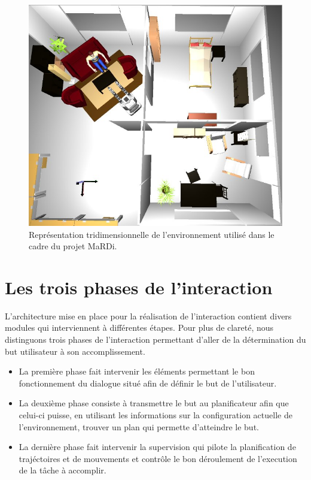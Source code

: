 \documentclass[a4paper,11pt,twoside]{StyleThese}
\begin{document}
\begin{figure}[ht!]
 \centering
  \includegraphics[width=0.89\linewidth]{./img/mardiSetup.jpg} 
  \caption {Représentation tridimensionnelle de l'environnement utilisé dans le cadre du projet MaRDi.}
  \label{fig:env}
\end{figure}


\section{Les trois phases de l'interaction}
\label{sec:troisPhases}



L'architecture mise en place pour la réalisation de l'interaction contient divers modules qui interviennent à différentes étapes.
Pour plus de clareté, nous distinguons trois phases de l'interaction permettant d'aller de la détermination du but utilisateur à son accomplissement. 

\begin{itemize}
\item La première phase fait intervenir les éléments permettant le bon fonctionnement du dialogue situé afin de définir le but de l'utilisateur.
\item La deuxième phase consiste à transmettre le but au planificateur afin que celui-ci puisse, en utilisant les informations sur la configuration actuelle de l'environnement, trouver un plan qui permette d'atteindre le but. 
\item La dernière phase fait intervenir la supervision qui pilote la planification de trajéctoires et de mouvements et contrôle le bon déroulement de l'execution de la tâche à accomplir.
\end{itemize}
\end{document}
